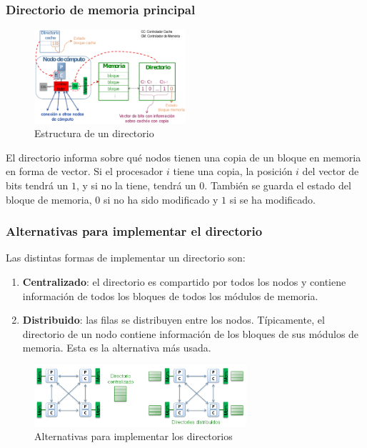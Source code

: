 \documentclass[10pt,a4paper,spanish]{report}
\begin{document}
\textcolor[rgb]{0.2,0.4,0.8}{\subsubsection{Directorio de memoria principal}}
\begin{figure}[!h]
    \centering
    \includegraphics[width=0.5\textwidth]{70}
    \caption{Estructura de un directorio}
    \label{directorio}
\end{figure}

El directorio informa sobre qué nodos tienen una copia de un bloque en memoria en forma de vector. Si el procesador $i$ tiene una copia, la posición $i$ del vector de bits tendrá un $1$, y si no la tiene, tendrá un $0$.  También se guarda el estado del bloque de memoria, $0$ si no ha sido modificado y $1$ si se ha modificado.

\textcolor[rgb]{0.2,0.4,0.8}{\subsubsection{Alternativas para implementar el directorio}}
Las distintas formas de implementar un directorio son:
\begin{enumerate}[\color{azul}{\bf $\heartsuit$}]
    \item \textcolor[rgb]{0.2,0.4,0.8}{\textbf{Centralizado}}: el directorio es compartido por todos los nodos y contiene información de todos los bloques de todos los módulos de memoria. 
    \item \textcolor[rgb]{0.2,0.4,0.8}{\textbf{Distribuido}}: las filas se distribuyen entre los nodos. Típicamente, el directorio de un nodo contiene información de los bloques de sus módulos de memoria. Esta es la alternativa más usada.
\end{enumerate}

\begin{figure}[!h]
    \centering
    \includegraphics[width=0.7\textwidth]{71}
    \caption{Alternativas para implementar los directorios}
    \label{implementacion_dir}
\end{figure}
\end{document}
